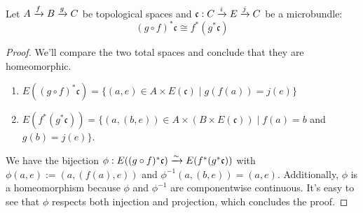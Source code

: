  \\
Let $A \xto{f} B \xto{g} C$ be topological spaces and $\mathfrak{c}: \bundle{C}{E}{i}{j}$ be a microbundle:
\[ (g \circ f)^*\mathfrak{c} \cong f^*(g^*\mathfrak{c}) \]
\begin{proof}
We'll compare the two total spaces and conclude that they are homeomorphic.
\begin{enumerate}
    \item $E((g \circ f)^*\mathfrak{c}) = \{ (a, e) \in A \times E(\mathfrak{c}) \mid g(f(a)) = j(e)\}$ 
    \item $E(f^*(g^*\mathfrak{c})) = \{ (a, (b, e)) \in A \times (B \times E(\mathfrak{c})) \mid f(a) = b$ and $ g(b) = j(e) \}$.
\end{enumerate}
We have the bijection $\phi: E((g \circ f)^*\mathfrak{c}) \isomto E(f^*(g^*\mathfrak{c}))$ with $\phi(a, e) := (a, (f(a), e))$ and $\phi^{-1}(a, (b, e)) = (a, e)$.
Additionally, $\phi$ is a homeomorphism because $\phi$ and $\phi^{-1}$ are componentwise continuous.
It's easy to see that $\phi$ respects both injection and projection, which concludes the proof.
\end{proof}